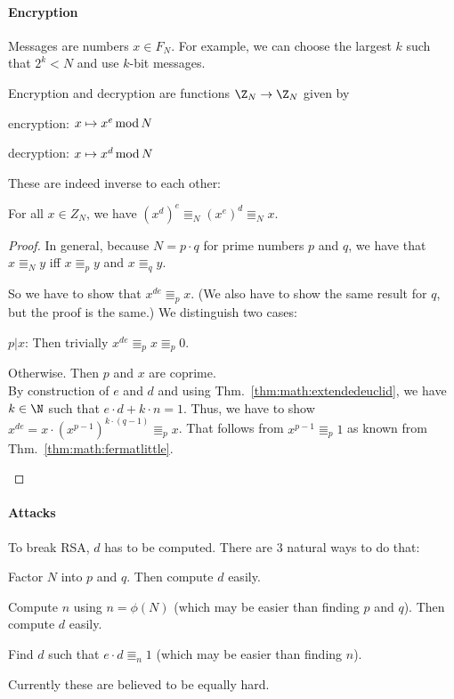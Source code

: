 \paragraph{Encryption}
Messages are numbers $x\in F_N$.
For example, we can choose the largest $k$ such that $2^k<N$ and use $k$-bit messages.

Encryption and decryption are functions $\Z_N\to \Z_N$ given by
\begin{compactitem}
 \item encryption: $x\mapsto x^e\mathop{\mathrm{mod}} N$
 \item decryption: $x\mapsto x^d\mathop{\mathrm{mod}} N$
\end{compactitem}

These are indeed inverse to each other:

\begin{theorem}
For all $x\in Z_N$, we have $(x^d)^e\Equiv_N (x^e)^d \Equiv_N x$.
\end{theorem}
\begin{proof}
In general, because $N=p\cdot q$ for prime numbers $p$ and $q$, we have that $x\Equiv_N y$ iff $x\Equiv_p y$ and $x\Equiv_q y$.

So we have to show that $x^{de}\Equiv_p x$.
(We also have to show the same result for $q$, but the proof is the same.)
We distinguish two cases:
\begin{compactitem}
\item $p|x$: Then trivially $x^{de}\Equiv_p x\Equiv_p 0$.
\item Otherwise. Then $p$ and $x$ are coprime.\\
   By construction of $e$ and $d$ and using Thm.~\ref{thm:math:extendedeuclid}, we have $k\in\N$ such that $e\cdot d+k\cdot n=1$.
   Thus, we have to show $x^{de}=x\cdot (x^{p-1})^{k\cdot(q-1)}\Equiv_p x$.
   That follows from $x^{p-1}\Equiv_p 1$ as known from Thm.~\ref{thm:math:fermatlittle}.
\end{compactitem}
\end{proof}

\paragraph{Attacks}
To break RSA, $d$ has to be computed.
There are $3$ natural ways to do that:
\begin{compactitem}
 \item Factor $N$ into $p$ and $q$. Then compute $d$ easily.
 \item Compute $n$ using $n=\phi(N)$ (which may be easier than finding $p$ and $q$). Then compute $d$ easily.
 \item Find $d$ such that $e\cdot d\Equiv_n 1$ (which may be easier than finding $n$).
\end{compactitem}
Currently these are believed to be equally hard.

